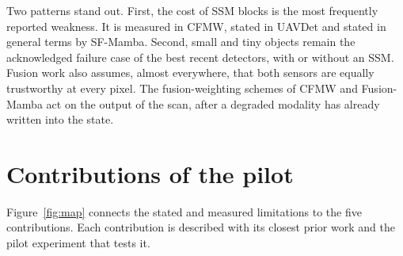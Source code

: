 \documentclass[11pt,a4paper]{article}
\begin{document}
Two patterns stand out. First, the cost of SSM blocks is the most frequently reported
weakness. It is measured in CFMW, stated in UAVDet and stated in general terms by
SF-Mamba. Second, small and tiny objects remain the acknowledged failure case of the
best recent detectors, with or without an SSM. Fusion work also assumes, almost
everywhere, that both sensors are equally trustworthy at every pixel. The
fusion-weighting schemes of CFMW and Fusion-Mamba act on the output of the scan,
after a degraded modality has already written into the state.

\section{Contributions of the pilot}
\label{sec:contrib}

Figure~\ref{fig:map} connects the stated and measured limitations to the five
contributions. Each contribution is described with its closest prior work and the
pilot experiment that tests it.
\end{document}
